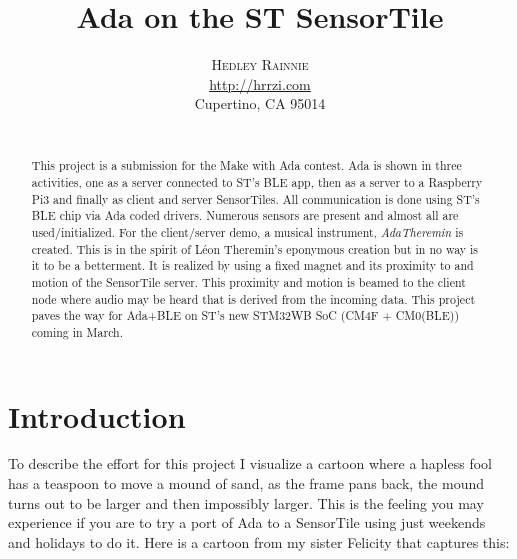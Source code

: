 \documentclass[11pt]{article}
\title{Ada on the ST SensorTile}
\author{
  \textsc{Hedley Rainnie}
  \mbox{}\\ %
  \url{http://hrrzi.com}\\
  Cupertino, CA 95014\\
  \mbox{}\\ %
}
\numberwithin{figure}{section}
\begin{document}
\maketitle

\begin{abstract}
This project is a submission for the Make with Ada contest. Ada is
shown in three activities, one as a server connected to ST's BLE app,
then as a server to a Raspberry Pi3 and finally as client and server
SensorTiles. All communication is done using ST's BLE chip via Ada
coded drivers. Numerous sensors are present and almost all are
used/initialized. For the client/server demo, a musical instrument,
\textit{AdaTheremin} is created. This is in the spirit of L\'eon
Theremin's eponymous creation but in no way is it to be a betterment.
It is realized by using a fixed magnet and its proximity to and motion
of the SensorTile server. This proximity and motion is beamed to the
client node where audio may be heard that is derived from the incoming
data. This project paves the way for Ada+BLE on ST's new STM32WB SoC
(CM4F + CM0(BLE)) coming in March.
\end{abstract}

\section{Introduction}
To describe the effort for this project I visualize a cartoon where a
hapless fool has a teaspoon to move a mound of sand, as the frame pans
back, the mound turns out to be larger and then impossibly
larger. This is the feeling you may experience if you are to try a
port of Ada to a SensorTile using just weekends and holidays to do
it. Here is a cartoon from my sister Felicity that captures this:
\end{document}
